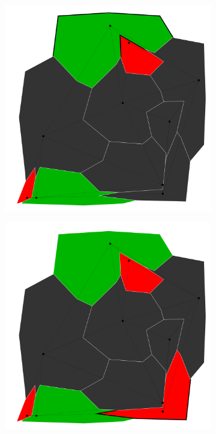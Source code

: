 \documentclass{article}
\begin{document}
\begin{figure}[h!]
\begin{subfigure}{0.18\textwidth}
				\caption{}
				\label{btc}
			\end{subfigure}
			\;
			\begin{subfigure}{0.18\textwidth}
				\centering
				\includegraphics[width=\textwidth]{images/sequences/simple_backtracking/bt_simple_I00006}
				\caption{}
				\label{btd}
			\end{subfigure}
			\;
			\begin{subfigure}{0.18\textwidth}
				\centering
				\includegraphics[width=\textwidth]{images/sequences/simple_backtracking/bt_simple_I00007}
				\caption{}
				\label{bte}
			\end{subfigure} \\
			

\end{figure}
\end{document}

